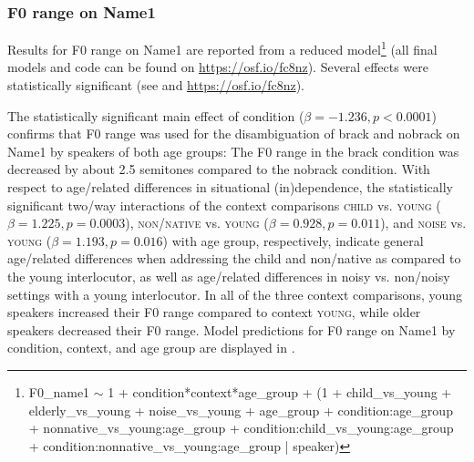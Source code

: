 \documentclass[output=paper]{langscibook}
\begin{document}
\subsubsection{F0 range on Name1}
Results for F0 range on Name1 are reported from a reduced model\footnote{\ttfamily F0\_name1 $\sim$ 1 + condition*context*age\_group + \newline \hspace*{7mm}(1 + child\_vs\_young + elderly\_vs\_young + noise\_vs\_young + \newline \hspace*{8mm}age\_group + \newline \hspace*{8mm}condition:age\_group + \newline \hspace*{8mm}nonnative\_vs\_young:age\_group + \newline \hspace*{8mm}condition:child\_vs\_young:age\_group + \newline \hspace*{8mm}condition:nonnative\_vs\_young:age\_group | speaker)} (all final models and code can be found on \href{https://osf.io/fc8nz/?view_only=1974f7d0721049e2be0401c973234518}{https://osf.io/fc8nz}). Several effects were statistically significant (see  and \href{https://osf.io/fc8nz/?view_only=1974f7d0721049e2be0401c973234518}{https://osf.io/fc8nz}).

The statistically significant main effect of condition ($\beta = -1.236,\allowbreak p<0.0001$) confirms that F0 range was used for the disambiguation of brack and nobrack on Name1 by speakers of both age groups: The F0 range in the brack condition was decreased by about 2.5 semitones compared to the nobrack condition. With respect to age\-/related differences in situational (in)de\-pen\-dence, the statistically significant two\-/way interactions of the context comparisons \textsc{child} vs. \textsc{young} ($\beta = 1.225,\allowbreak p = 0.0003$), \textsc{non\-/native} vs. \textsc{young} ($\beta = 0.928,\allowbreak p = 0.011$), and \textsc{noise} vs. \textsc{young} ($\beta = 1.193,\allowbreak p = 0.016$) with age group, respectively, indicate general age\-/related differences when addressing the child and non\-/native as compared to the young interlocutor, as well as age\-/related differences in noisy vs. non\-/noisy settings with a young interlocutor. In all of the three context comparisons, young speakers increased their F0 range compared to context \textsc{young}, while older speakers decreased their F0 range. Model predictions for F0 range on Name1 by condition, context, and age group are displayed in .
\end{document}

